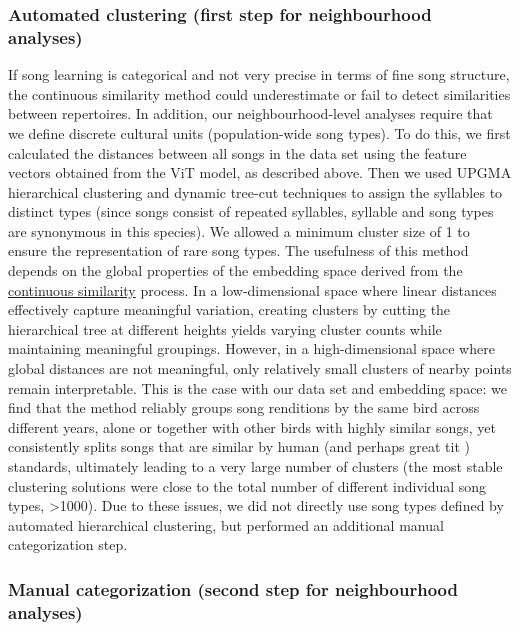 \documentclass[9pt, onecolumn, twoside, lineno]{gsajnl}
\begin{document}
\subsubsection{Automated clustering (first step for neighbourhood analyses)}

If song learning is categorical and not very precise in terms of fine song structure, the continuous similarity method could underestimate or fail to detect similarities between repertoires. In addition, our neighbourhood-level analyses require that we define discrete cultural units (population-wide song types). To do this, we  first calculated the distances between all songs in the data set using the feature vectors obtained from the ViT model, as described above. Then we used UPGMA hierarchical clustering and dynamic tree-cut techniques to assign the syllables to distinct types (since songs consist of repeated syllables, syllable and song types are synonymous in this species). We allowed a minimum cluster size of 1 to ensure the representation of rare song types. The usefulness of this method depends on the global properties of the embedding space derived from the \hyperref[sc:song-similarity]{continuous similarity} process. In a low-dimensional space where linear distances effectively capture meaningful variation, creating clusters by cutting the hierarchical tree at different heights yields varying cluster counts while maintaining meaningful groupings. However, in a high-dimensional space where global distances are not meaningful, only relatively small clusters of nearby points remain interpretable. This is the case with our data set and embedding space: we find that the method reliably groups song renditions by the same bird across different years, alone or together with other birds with highly similar songs, yet consistently splits songs that are similar by human (and perhaps great tit \autocite{falls1982}) standards, ultimately leading to a very large number of clusters (the most stable clustering solutions were close to the total number of different individual song types, >1000). Due to these issues, we did not directly use song types defined by automated hierarchical clustering, but performed an additional manual categorization step.

\subsubsection{Manual categorization (second step for neighbourhood analyses)}
\label{sc:manual-categorization}
\end{document}

